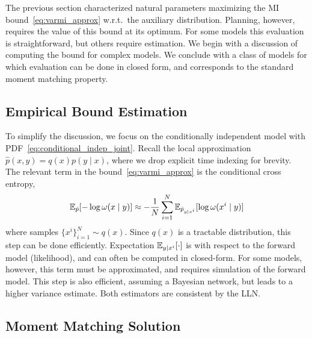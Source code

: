 The previous section characterized natural parameters maximizing the
MI bound~\eqref{eq:varmi_approx} w.r.t.~the auxiliary distribution.
Planning, however, requires the value of this bound at its optimum.
For some models this evaluation is straightforward, but others require
estimation.  We begin with a discussion of computing the bound for
complex models.  We conclude with a class of models for which
evaluation can be done in closed form, and corresponds to the standard
moment matching property.

\subsection{Empirical Bound Estimation}


To simplify the discussion, we focus on the conditionally independent
model with PDF~\eqref{eq:conditional_indep_joint}.  Recall the local
approximation $\hat{p}(x,y) = q(x)p(y\mid x)$, where we drop explicit
time indexing for brevity.  The relevant term in the
bound~\eqref{eq:varmi_approx} is the conditional cross
entropy,
\[
  \mathbb{E}_{\hat{p}}[ -\log \omega(x \mid y)
  ] \approx - \frac{1}{N} \sum_{i=1}^N \mathbb{E}_{\hat{p}_{y \mid
    x^i}}[ \log \omega(x^i \mid y) ]
\]
where samples $\{x^i\}_{i=1}^N \sim q(x)$.  Since $q(x)$ is a
tractable distribution, this step can be done efficiently.
Expectation $\mathbb{E}_{y\mid x^i}[\cdot]$ is with respect to the forward
model (likelihood), and can often be computed in closed-form.  For
some models, however, this term must be approximated, and requires
simulation of the forward model.  This step is also efficient,
assuming a Bayesian network, but leads to a higher variance estimate.
Both estimators are consistent by the LLN.


\subsection{Moment Matching Solution}\label{sec:moment_match}

